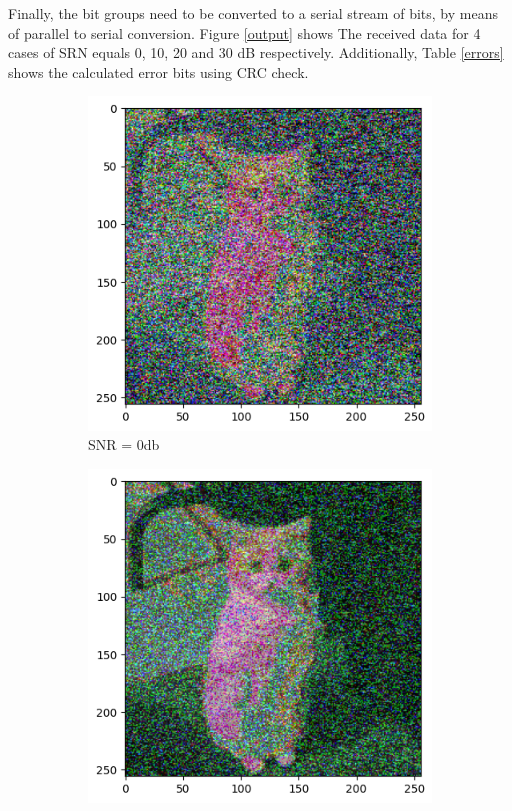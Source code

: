 Finally, the bit groups need to be converted to a serial stream of bits, by means of parallel to serial conversion. Figure \ref{output} shows The received data for 4 cases of SRN equals 0, 10, 20 and 30 dB respectively. Additionally, Table \ref{errors} shows the calculated error bits using CRC check.

\begin{figure}[htbp]
    \centering
    \begin{subfigure}[t]{.49\linewidth}
        \includegraphics[width=\linewidth]{../Source/results/output_0db}
        \caption{SNR = 0db}
        \label{0db}
    \end{subfigure}
    \hfil
    \begin{subfigure}[t]{0.49\linewidth}
        \includegraphics[width=\linewidth]{../Source/results/output_10db}

\end{subfigure}
\end{figure}
